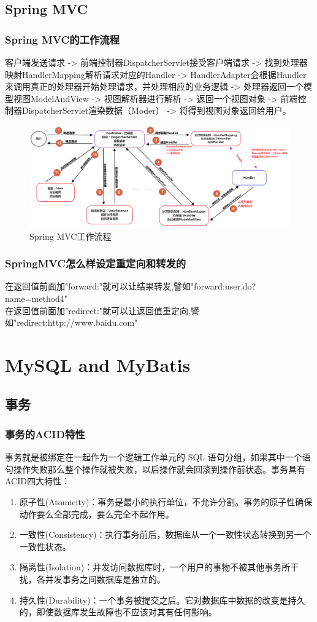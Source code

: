 \documentclass[a4paper]{report}
\begin{document}
\section{Spring MVC}
\subsection{Spring MVC的工作流程}
客户端发送请求 -> 前端控制器DispatcherServlet接受客户端请求 -> 找到处理器映射HandlerMapping解析请求对应的Handler -> HandlerAdapter会根据Handler来调用真正的处理器开始处理请求，并处理相应的业务逻辑 -> 处理器返回一个模型视图ModelAndView -> 视图解析器进行解析 -> 返回一个视图对象 -> 前端控制器DispatcherServlet渲染数据（Moder） -> 将得到视图对象返回给用户。
\begin{figure}[H]
    \centering
    \includegraphics[scale=0.65]{./images/0016.png}
    \caption{Spring MVC工作流程}
\end{figure}
\subsection{SpringMVC怎么样设定重定向和转发的}
在返回值前面加"forward:"就可以让结果转发,譬如"forward:user.do?name=method4"\\
在返回值前面加"redirect:"就可以让返回值重定向,譬如"redirect:http://www.baidu.com"

\chapter{MySQL and MyBatis}
\section{事务}
\subsection{事务的ACID特性}
事务就是被绑定在一起作为一个逻辑工作单元的 SQL 语句分组，如果其中一个语句操作失败那么整个操作就被失败，以后操作就会回滚到操作前状态。事务具有ACID四大特性：
\begin{enumerate}
    \item 原子性(Atomicity)：事务是最小的执行单位，不允许分割。事务的原子性确保动作要么全部完成，要么完全不起作用。
    \item 一致性(Consistency)：执行事务前后，数据库从一个一致性状态转换到另一个一致性状态。
    \item 隔离性(Isolation)：并发访问数据库时，一个用户的事物不被其他事务所干扰，各并发事务之间数据库是独立的。
    \item 持久性(Durability)：一个事务被提交之后。它对数据库中数据的改变是持久的，即使数据库发生故障也不应该对其有任何影响。
\end{enumerate}
\end{document}
